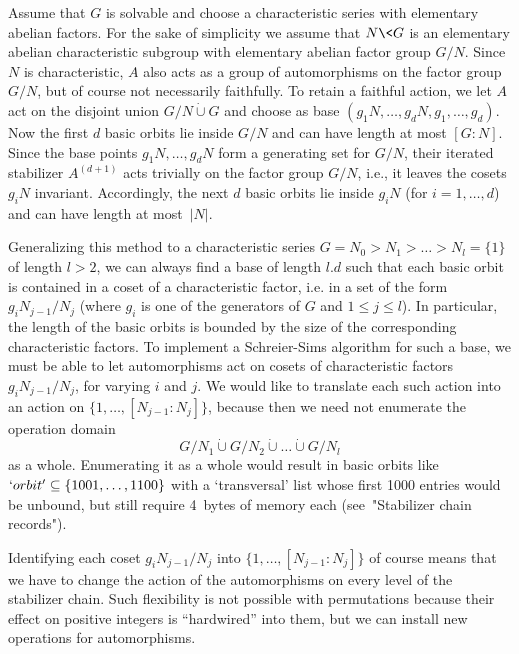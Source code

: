 Assume that   $G$ is solvable  and  choose  a  characteristic series with
elementary abelian factors. For the sake of  simplicity we assume that $N
\< G$ is an   elementary abelian characteristic subgroup  with elementary
abelian factor group $G/N$. Since $N$ is characteristic, $A$ also acts as
a group of automorphisms  on the factor  group $G/N$,  but of course  not
necessarily  faithfully. To retain  a faithful action,  we let $A$ act on
the disjoint  union  $G/N   \mathbin{\dot\cup} G$  and  choose  as   base
$(g_1N,\ldots,g_dN,g_1,\ldots,g_d)$.  Now the first  $d$ basic orbits lie
inside $G/N$ and can have length at  most $[G\mathbin:N]$. Since the base
points  $g_1N,\ldots,  g_dN$  form a  generating   set  for  $G/N$, their
iterated stabilizer $A^{(d+1)}$ acts trivially on the factor group $G/N$,
i.e., it leaves  the cosets $g_iN$  invariant. Accordingly,  the next $d$
basic orbits lie inside  $g_iN$ (for $i=1,\ldots,d$)  and can have length
at most~$|N|$.

Generalizing this method to a characteristic series $G=N_0 > N_1 > \ldots
> N_l=\{1\}$ of length $l>2$, we  can always find  a base of length $l.d$
such that each  basic orbit is  contained in a  coset of a characteristic
factor, i.e. in a set of the form $g_iN_{j-1}/N_j$ (where $g_i$ is one of
the generators  of $G$ and $1\le j\le  l$). In particular, the  length of
the basic  orbits   is  bounded   by  the  size  of    the  corresponding
characteristic factors. To implement a Schreier-Sims algorithm for such a
base, we  must  be   able  to  let   automorphisms  act  on   cosets   of
characteristic  factors $g_iN_{j-1}/N_j$, for  varying  $i$  and $j$.  We
would    like to    translate each such     action  into  an  action   on
$\{1,\ldots,[N_{j-1}\mathbin: N_j]\}$, because then we need not enumerate
the operation domain
$$
   G/N_1 \mathbin{\dot\cup} G/N_2 \mathbin{\dot\cup} \ldots
         \mathbin{\dot\cup} G/N_l $$
as a whole. Enumerating it  as a whole would result  in basic orbits like
$`orbit'\subseteq \{1001,\ldots,1100\}$  with a  `transversal' list whose
first 1000 entries would be unbound, but  still require 4~bytes of memory
each (see~"Stabilizer chain records").

Identifying   each  coset   $g_iN_{j-1}/N_j$ into   $\{1,\ldots, [N_{j-1}
\mathbin: N_j]\}$ of  course means that we have  to change the action  of
the automorphisms on     every  level of   the  stabilizer   chain.  Such
flexibility is not   possible with permutations  because their  effect on
positive  integers  is ``hardwired''  into them,  but  we can install new
operations for automorphisms.


